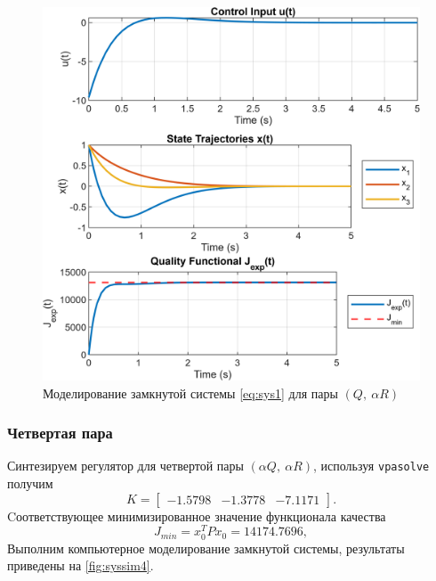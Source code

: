 \begin{figure}[H]
    \centering
    \includegraphics[width=1\linewidth]{figs/1_sim3.png}
    \caption{Моделирование замкнутой системы \eqref{eq:sys1} для пары $(Q,\ \alpha R)$}
    \label{fig:syssim3}
\end{figure}

\newpage\subsubsection{Четвертая пара}

Синтезируем регулятор для четвертой пары $(\alpha Q,\ \alpha R)$, используя \texttt{vpasolve}
получим
\begin{equation*}
    K=\begin{bmatrix}
        -1.5798  & -1.3778 &  -7.1171
    \end{bmatrix}.
\end{equation*}
Cоответствующее минимизированное значение функционала качества
\begin{equation*}
    J_{min}=x_0^TPx_0=14174.7696,
\end{equation*}
Выполним компьютерное моделирование замкнутой системы,
результаты приведены на \autoref{fig:syssim4}.

